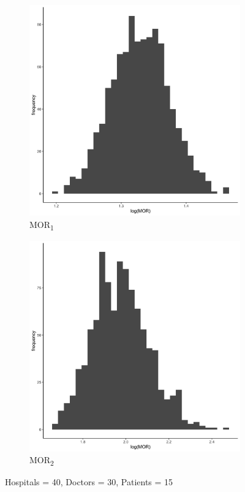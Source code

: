 \documentclass[
  letterpaper,
  DIV=11,
  numbers=noendperiod,
  titlepage]{scrartcl}
\begin{document}
\vspace{10mm}

\begin{figure}
\centering
\begin{subfigure}{.49\textwidth}
    \centering
    \includegraphics[width=.95\linewidth]{../../plots/three-lvl-ran-int/high-prev/hist_40_30_15_three_lvl_high_prev_mor1.png}  
    \caption{MOR\textsubscript{1}}
    \label{l40m30n151}
\end{subfigure}
\begin{subfigure}{.49\textwidth}
    \centering
    \includegraphics[width=.95\linewidth]{../../plots/three-lvl-ran-int/high-prev/hist_40_30_15_three_lvl_high_prev_mor2.png}
    \caption{MOR\textsubscript{2}}
    \label{l40m30n152}
\end{subfigure}
\caption{Hospitals = 40, Doctors = 30, Patients = 15}
\label{mor2}
\end{figure}
\end{document}
